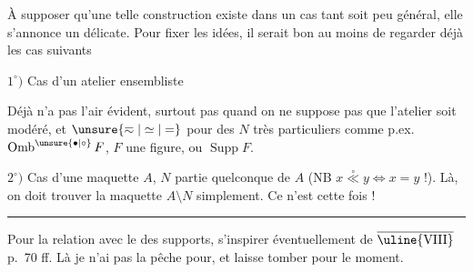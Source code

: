
À supposer qu'une telle construction existe dans un cas tant soit peu général, elle s'annonce un  délicate. Pour fixer les idées, il serait bon  au moins de regarder déjà les cas suivants

$1^\circ)$ Cas d'un atelier ensembliste

 Déjà  n'a pas l'air évident, surtout pas quand on ne suppose pas que l'atelier soit modéré, et $\unsure{\eqsim|\simeq|=}$ pour des $N$ très particuliers comme p.ex. $\operatorname{Omb}^{\unsure{\bullet|\circ}}F$, $F$ une figure, ou $\operatorname{Supp}F$.

$2^\circ)$ Cas d'une maquette $A$, $N$ partie quelconque de $A$ (NB $x\overset{\circ}{\ll}y\Leftrightarrow x=y$ !). Là, on doit trouver la maquette $A\setminus N$ simplement. Ce n'est   cette fois !

\par\noindent\hspace*{0.3\linewidth}\rule{0.25\linewidth}{0.4pt}\par

Pour la relation avec le  des supports, s'inspirer éventuellement de  $\overline{\text{\uline{VIII}}}$ p.~70 ff. Là je n'ai pas la pêche pour, et laisse tomber pour le moment.
